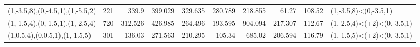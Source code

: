 \begin{tabular}{lrrrrrrrrl}
 (1,-3.5,8),(0,-4.5,1),(1,-5.5,2) &        221 &                          339.9    &                        399.029  &                           329.635 &                         280.789 &                           218.855 &                          61.27  &     108.52 & (1,-3.5,8)<(0,-3.5,1)            \\
 (1,-1.5,4),(0,-1.5,1),(1,-2.5,4) &        720 &                          312.526  &                        426.985  &                           264.496 &                         193.595 &                           904.094 &                         217.307 &     112.67 & (1,-2.5,4)<(+2)<(0,-3.5,1)       \\
 (1,0.5,4),(0,0.5,1),(1,-1.5,5)   &        301 &                          136.03   &                        271.563  &                           210.295 &                         105.34  &                           685.02  &                         206.594 &     116.79 & (1,-1.5,5)<(+2)<(0,-3.5,1)       \\
\hline
\end{tabular}